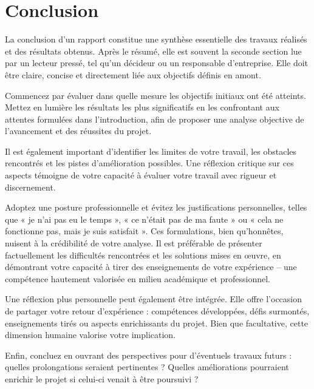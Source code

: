 \chapter{Conclusion}

La conclusion d'un rapport constitue une synthèse essentielle des travaux réalisés et des résultats obtenus. Après le résumé, elle est souvent la seconde section lue par un lecteur pressé, tel qu'un décideur ou un responsable d'entreprise. Elle doit être claire, concise et directement liée aux objectifs définis en amont.

Commencez par évaluer dans quelle mesure les objectifs initiaux ont été atteints. Mettez en lumière les résultats les plus significatifs en les confrontant aux attentes formulées dans l'introduction, afin de proposer une analyse objective de l'avancement et des réussites du projet.

Il est également important d'identifier les limites de votre travail, les obstacles rencontrés et les pistes d'amélioration possibles. Une réflexion critique sur ces aspects témoigne de votre capacité à évaluer votre travail avec rigueur et discernement.

Adoptez une posture professionnelle et évitez les justifications personnelles, telles que « je n'ai pas eu le temps », « ce n'était pas de ma faute » ou « cela ne fonctionne pas, mais je suis satisfait ». Ces formulations, bien qu'honnêtes, nuisent à la crédibilité de votre analyse. Il est préférable de présenter factuellement les difficultés rencontrées et les solutions mises en œuvre, en démontrant votre capacité à tirer des enseignements de votre expérience -- une compétence hautement valorisée en milieu académique et professionnel.

Une réflexion plus personnelle peut également être intégrée. Elle offre l'occasion de partager votre retour d'expérience : compétences développées, défis surmontés, enseignements tirés ou aspects enrichissants du projet. Bien que facultative, cette dimension humaine valorise votre implication.

Enfin, concluez en ouvrant des perspectives pour d'éventuels travaux futurs : quelles prolongations seraient pertinentes ? Quelles améliorations pourraient enrichir le projet si celui-ci venait à être poursuivi ?



\vfil
\hspace{8cm}\makeatletter\@author\makeatother\par
\hspace{8cm}\begin{minipage}{5cm}
    \printsignature
\end{minipage}